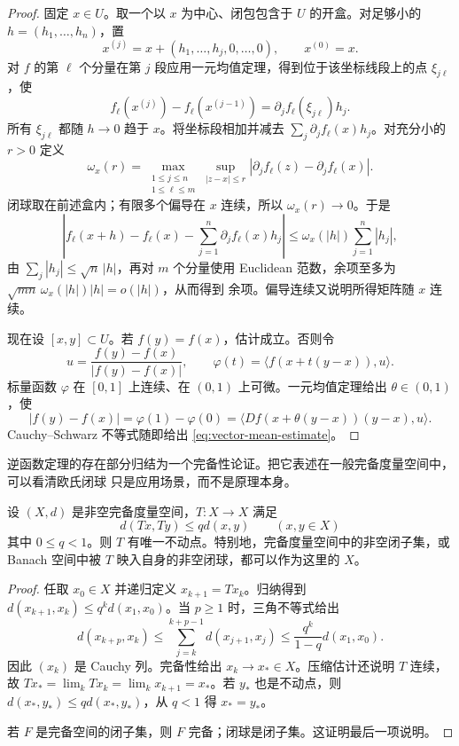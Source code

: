 \begin{proof}
固定 $x\in U$。取一个以 $x$ 为中心、闭包包含于 $U$ 的开盒。对足够小的
$h=(h_1,\dots,h_n)$，置
\[
 x^{(j)}=x+(h_1,\dots,h_j,0,\dots,0),\qquad x^{(0)}=x.
\]
对 $f$ 的第 $\ell$ 个分量在第 $j$ 段应用一元均值定理，得到位于该坐标线段上的点
$\xi_{j\ell}$，使
\[
 f_\ell(x^{(j)})-f_\ell(x^{(j-1)})
 =\partial_j f_\ell(\xi_{j\ell})h_j.
\]
所有 $\xi_{j\ell}$ 都随 $h\to0$ 趋于 $x$。将坐标段相加并减去
$\sum_j\partial_jf_\ell(x)h_j$。对充分小的 $r>0$ 定义
\[
 \omega_x(r)=
 \max_{\substack{1\le j\le n\\1\le\ell\le m}}
 \sup_{|z-x|\le r}
 |\partial_jf_\ell(z)-\partial_jf_\ell(x)|.
\]
闭球取在前述盒内；有限多个偏导在 $x$ 连续，所以 $\omega_x(r)\to0$。于是
\[
 \left|f_\ell(x+h)-f_\ell(x)-\sum_{j=1}^n\partial_jf_\ell(x)h_j\right|
 \le \omega_x(|h|)\sum_{j=1}^n|h_j|,
\]
由 $\sum_j|h_j|\le\sqrt n\,|h|$，再对 $m$ 个分量使用 Euclidean 范数，余项至多为
$\sqrt{mn}\,\omega_x(|h|)|h|=o(|h|)$，从而得到
\Frechet{} 余项。偏导连续又说明所得矩阵随 $x$ 连续。

现在设 $[x,y]\subset U$。若 $f(y)=f(x)$，估计成立。否则令
\[
 u=\frac{f(y)-f(x)}{|f(y)-f(x)|},\qquad
 \varphi(t)=\langle f(x+t(y-x)),u\rangle .
\]
标量函数 $\varphi$ 在 $[0,1]$ 上连续、在 $(0,1)$ 上可微。一元均值定理给出
$\theta\in(0,1)$，使
\[
 |f(y)-f(x)|=\varphi(1)-\varphi(0)
 =\langle Df(x+\theta(y-x))(y-x),u\rangle.
\]
Cauchy--Schwarz 不等式随即给出 \eqref{eq:vector-mean-estimate}。
\end{proof}

逆函数定理的存在部分归结为一个完备性论证。把它表述在一般完备度量空间中，可以看清欧氏闭球
只是应用场景，而不是原理本身。

\begin{lemma}[压缩映射原理]\label{lemma:2-4-1-2a}
设 $(X,d)$ 是非空完备度量空间，$T:X\to X$ 满足
\[
 d(Tx,Ty)\le qd(x,y)\qquad(x,y\in X)
\]
其中 $0\le q<1$。则 $T$ 有唯一不动点。特别地，完备度量空间中的非空闭子集，或 Banach
空间中被 $T$ 映入自身的非空闭球，都可以作为这里的 $X$。
\end{lemma}

\begin{proof}
任取 $x_0\in X$ 并递归定义 $x_{k+1}=Tx_k$。归纳得到
$d(x_{k+1},x_k)\le q^kd(x_1,x_0)$。当 $p\ge1$ 时，三角不等式给出
\[
 d(x_{k+p},x_k)
 \le\sum_{j=k}^{k+p-1}d(x_{j+1},x_j)
 \le\frac{q^k}{1-q}d(x_1,x_0).
\]
因此 $(x_k)$ 是 Cauchy 列。完备性给出 $x_k\to x_*\in X$。压缩估计还说明 $T$ 连续，故
$Tx_*=\lim_kTx_k=\lim_kx_{k+1}=x_*$。若 $y_*$ 也是不动点，则
$d(x_*,y_*)\le qd(x_*,y_*)$，从 $q<1$ 得 $x_*=y_*$。

若 $F$ 是完备空间的闭子集，则 $F$ 完备；闭球是闭子集。这证明最后一项说明。
\end{proof}

